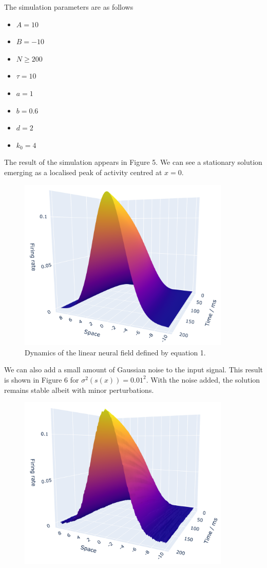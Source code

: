 \documentclass[12pt]{article}
\begin{document}
\begin{enumerate}
The simulation parameters are as follows
\begin{itemize}
    \item $A = 10$
    \item $B = -10$
    \item $N \geq 200$
    \item $\tau = 10$
    \item $a = 1$
    \item $b=0.6$
    \item $d=2$
    \item $k_{0}=4$
\end{itemize}
The result of the simulation appears in Figure 5. We can see a stationary solution emerging as a localised peak of activity centred at $x=0$.
\begin{figure}[H]
    \centering
    \includegraphics[width=0.9\textwidth]{./figure5.png}
    \caption{Dynamics of the linear neural field defined by equation 1.}
\end{figure}
We can also add a small amount of Gaussian noise to the input signal. This result is shown in Figure 6 for $\sigma^{2}(s(x))=0.01^2$.
With the noise added, the solution remains stable albeit with minor perturbations.
\begin{figure}[H]
    \centering
    \includegraphics[width=0.9\textwidth]{./figure6.png}

\end{figure}
\end{enumerate}
\end{document}

